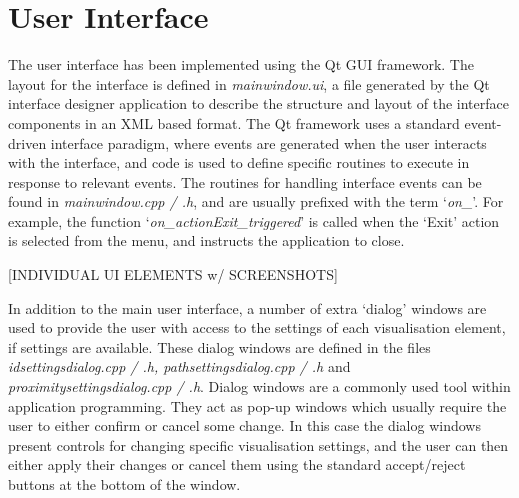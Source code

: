 
\section{User Interface}
The user interface has been implemented using the Qt GUI framework. The layout for the interface is defined in \textit{mainwindow.ui}, a file generated by the Qt interface designer application to describe the structure and layout of the interface components in an XML based format. The Qt framework uses a standard event-driven interface paradigm, where events are generated when the user interacts with the interface, and code is used to define specific routines to execute in response to relevant events. The routines for handling interface events can be found in \textit{mainwindow.cpp / .h}, and are usually prefixed with the term `\textit{on\_}'. For example, the function `\textit{on\_actionExit\_triggered}' is called when the `Exit' action is selected from the menu, and instructs the application to close.

[INDIVIDUAL UI ELEMENTS w/ SCREENSHOTS]

In addition to the main user interface, a number of extra `dialog' windows are used to provide the user with access to the settings of each visualisation element, if settings are available. These dialog windows are defined in the files  \textit{idsettingsdialog.cpp / .h, pathsettingsdialog.cpp / .h} and \textit{proximitysettingsdialog.cpp / .h}. Dialog windows are a commonly used tool within application programming. They act as pop-up windows which usually require the user to either confirm or cancel some change. In this case the dialog windows present controls for changing specific visualisation settings, and the user can then either apply their changes or cancel them using the standard accept/reject buttons at the bottom of the window.


